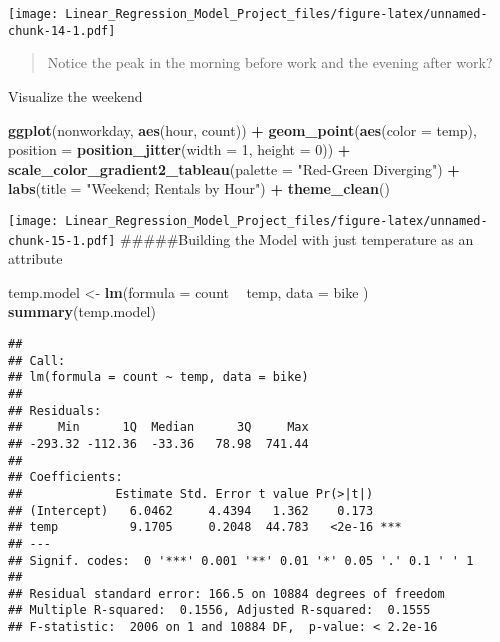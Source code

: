 \documentclass[]{article}
\newenvironment{Shaded}{\begin{snugshade}}{\end{snugshade}}
\newcommand{\KeywordTok}[1]{\textcolor[rgb]{0.13,0.29,0.53}{\textbf{#1}}}
\newcommand{\DataTypeTok}[1]{\textcolor[rgb]{0.13,0.29,0.53}{#1}}
\newcommand{\DecValTok}[1]{\textcolor[rgb]{0.00,0.00,0.81}{#1}}
\newcommand{\StringTok}[1]{\textcolor[rgb]{0.31,0.60,0.02}{#1}}
\newcommand{\OperatorTok}[1]{\textcolor[rgb]{0.81,0.36,0.00}{\textbf{#1}}}
\newcommand{\NormalTok}[1]{#1}
\begin{document}
\texttt{[image: Linear\_Regression\_Model\_Project\_files/figure-latex/unnamed-chunk-14-1.pdf]}

\begin{quote}
Notice the peak in the morning before work and the evening after work?
\end{quote}

Visualize the weekend

\begin{Shaded}
\begin{Highlighting}[]
\KeywordTok{ggplot}\NormalTok{(nonworkday, }\KeywordTok{aes}\NormalTok{(hour, count)) }\OperatorTok{+}
\StringTok{    }\KeywordTok{geom_point}\NormalTok{(}\KeywordTok{aes}\NormalTok{(}\DataTypeTok{color =}\NormalTok{ temp), }\DataTypeTok{position =} \KeywordTok{position_jitter}\NormalTok{(}\DataTypeTok{width =} \DecValTok{1}\NormalTok{, }\DataTypeTok{height =} \DecValTok{0}\NormalTok{)) }\OperatorTok{+}
\StringTok{    }\KeywordTok{scale_color_gradient2_tableau}\NormalTok{(}\DataTypeTok{palette =} \StringTok{"Red-Green Diverging"}\NormalTok{) }\OperatorTok{+}
\StringTok{    }\KeywordTok{labs}\NormalTok{(}\DataTypeTok{title =} \StringTok{"Weekend; Rentals by Hour"}\NormalTok{) }\OperatorTok{+}
\StringTok{    }\KeywordTok{theme_clean}\NormalTok{()}
\end{Highlighting}
\end{Shaded}

\texttt{[image: Linear\_Regression\_Model\_Project\_files/figure-latex/unnamed-chunk-15-1.pdf]}
\#\#\#\#\#Building the Model with just temperature as an attribute

\begin{Shaded}
\begin{Highlighting}[]
\NormalTok{temp.model <-}\StringTok{ }\KeywordTok{lm}\NormalTok{(}\DataTypeTok{formula =}\NormalTok{ count }\OperatorTok{~}\StringTok{ }\NormalTok{temp, }\DataTypeTok{data =}\NormalTok{ bike )}
\KeywordTok{summary}\NormalTok{(temp.model)}
\end{Highlighting}
\end{Shaded}

\begin{verbatim}
## 
## Call:
## lm(formula = count ~ temp, data = bike)
## 
## Residuals:
##     Min      1Q  Median      3Q     Max 
## -293.32 -112.36  -33.36   78.98  741.44 
## 
## Coefficients:
##             Estimate Std. Error t value Pr(>|t|)    
## (Intercept)   6.0462     4.4394   1.362    0.173    
## temp          9.1705     0.2048  44.783   <2e-16 ***
## ---
## Signif. codes:  0 '***' 0.001 '**' 0.01 '*' 0.05 '.' 0.1 ' ' 1
## 
## Residual standard error: 166.5 on 10884 degrees of freedom
## Multiple R-squared:  0.1556, Adjusted R-squared:  0.1555 
## F-statistic:  2006 on 1 and 10884 DF,  p-value: < 2.2e-16
\end{verbatim}
\end{document}
